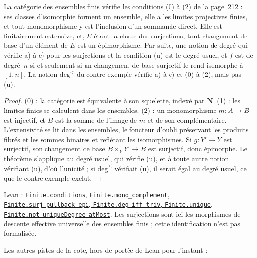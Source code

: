 \begin{corollaire}
La catégorie des ensembles finis vérifie les conditions (0) à (2) de la page~212 : ses classes d'isomorphie forment un ensemble, elle a les limites projectives finies, et tout monomorphisme y est l'inclusion d'un sommande direct. Elle est finitairement extensive, et, $E$ étant la classe des surjections, tout changement de base d'un élément de $E$ est un épimorphisme. Par suite, une notion de degré qui vérifie a) à e) pour les surjections et la condition (u) est le degré usuel, et $f$ est de degré~$n$ si et seulement si un changement de base surjectif le rend isomorphe à $[1, n]$. La notion $\mathrm{deg}^{\leq}$ du contre-exemple vérifie a) à e) et (0) à (2), mais pas (u).
\end{corollaire}

\begin{proof}
(0) : la catégorie est équivalente à son squelette, indexé par $\mathbf N$. (1) : les limites finies se calculent dans les ensembles. (2) : un monomorphisme $m : A \to B$ est injectif, et $B$ est la somme de l'image de $m$ et de son complémentaire. L'extensivité se lit dans les ensembles, le foncteur d'oubli préservant les produits fibrés et les sommes binaires et reflétant les isomorphismes. Si $g : Y' \to Y$ est surjectif, son changement de base $B \times_Y Y' \to B$ est surjectif, donc épimorphe. Le théorème s'applique au degré usuel, qui vérifie (u), et à toute autre notion vérifiant (u), d'où l'unicité ; si $\mathrm{deg}^{\leq}$ vérifiait (u), il serait égal au degré usuel, ce que le contre-exemple exclut.
\end{proof}

\noindent Lean : \href{\leanblob/AlgebraicGeometry/Folder29.lean}{\texttt{Finite.\allowbreak{}conditions}, \texttt{Finite.\allowbreak{}mono\_complement}, \texttt{Finite.\allowbreak{}surj\_pullback\_epi}, \texttt{Finite.\allowbreak{}deg\_iff\_triv}, \texttt{Finite.\allowbreak{}unique}, \texttt{Finite.\allowbreak{}not\_uniqueDegree\_atMost}}. Les surjections sont ici les morphismes de descente effective universelle des ensembles finis ; cette identification n'est pas formalisée.

Les autres pistes de la cote, hors de portée de Lean pour l'instant :

